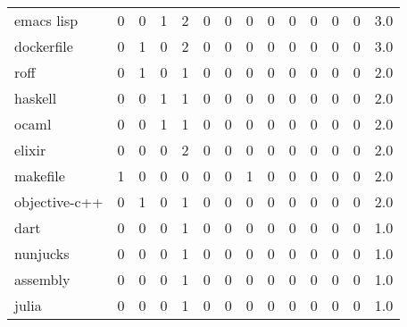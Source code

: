 \begin{tabular}{lrrrrrrrrrrrrr}
emacs lisp    &        0 &       0 &          1 &               2 &                0 &       0 &          0 &         0 &         0 &      0 &             0 &         0 &      3.0 \\
dockerfile    &        0 &       1 &          0 &               2 &                0 &       0 &          0 &         0 &         0 &      0 &             0 &         0 &      3.0 \\
roff          &        0 &       1 &          0 &               1 &                0 &       0 &          0 &         0 &         0 &      0 &             0 &         0 &      2.0 \\
haskell       &        0 &       0 &          1 &               1 &                0 &       0 &          0 &         0 &         0 &      0 &             0 &         0 &      2.0 \\
ocaml         &        0 &       0 &          1 &               1 &                0 &       0 &          0 &         0 &         0 &      0 &             0 &         0 &      2.0 \\
elixir        &        0 &       0 &          0 &               2 &                0 &       0 &          0 &         0 &         0 &      0 &             0 &         0 &      2.0 \\
makefile      &        1 &       0 &          0 &               0 &                0 &       0 &          1 &         0 &         0 &      0 &             0 &         0 &      2.0 \\
objective-c++ &        0 &       1 &          0 &               1 &                0 &       0 &          0 &         0 &         0 &      0 &             0 &         0 &      2.0 \\
dart          &        0 &       0 &          0 &               1 &                0 &       0 &          0 &         0 &         0 &      0 &             0 &         0 &      1.0 \\
nunjucks      &        0 &       0 &          0 &               1 &                0 &       0 &          0 &         0 &         0 &      0 &             0 &         0 &      1.0 \\
assembly      &        0 &       0 &          0 &               1 &                0 &       0 &          0 &         0 &         0 &      0 &             0 &         0 &      1.0 \\
julia         &        0 &       0 &          0 &               1 &                0 &       0 &          0 &         0 &         0 &      0 &             0 &         0 &      1.0 \\

\end{tabular}
